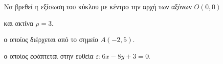 Να βρεθεί η εξίσωση του κύκλου με κέντρο την αρχή των αξόνων $ O(0,0) $ 
\begin{alist}
\item και ακτίνα $ \rho=3 $.
\item ο οποίος διέρχεται από το σημείο $ A(-2,5) $.
\item ο οποίος εφάπτεται στην ευθεία $ \varepsilon : 6x-8y+3=0 $.
\end{alist}
